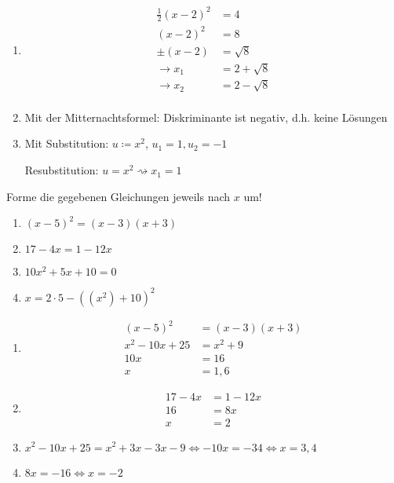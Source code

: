 \begin{lsg}{}
  \begin{multicols}{3}
    \begin{enumerate}
      \item \begin{align*}
        \frac 1 2 (x-2)^2 &= 4\\
        (x-2)^2 &= 8\\
        \pm(x-2)&=\sqrt 8\\
        \rightarrow x_1&=2+\sqrt 8\\
        \rightarrow x_2&=2-\sqrt 8\\
      \end{align*}
      \columnbreak
      \item Mit der Mitternachtsformel: Diskriminante ist negativ, d.h. keine Lösungen
      \columnbreak
      \item Mit Substitution: $u\coloneqq x^2$, $u_1=1, u_2=-1$

			Resubstitution: $u=x^2 \rightsquigarrow x_1=1$
    \end{enumerate}
  \end{multicols}
\end{lsg}


Forme die gegebenen Gleichungen jeweils nach $x$ um!
\begin{multicols}{2}
	\begin{enumerate}
		\item $(x-5)^2=(x-3)(x+3)$
		\item $17-4x=1-12x$
		\item $10x^2+5x+10 = 0$
		\item $x=2\cdot 5-((x^2)+10)^2$
	\end{enumerate}
\end{multicols}

\begin{lsg}{}
	\begin{enumerate}
		\item \begin{align*}
			(x-5)^2 &= (x-3)(x+3)\\
			x^2-10x+25 &= x^2+9\\
			10x &= 16\\
			x &= 1,6
		\end{align*}
		\item \begin{align*}
			17-4x &= 1-12x\\
			16 &= 8x\\
			x &= 2
		\end{align*}
		\item $x^2-10x+25=x^2+3x-3x-9 \Leftrightarrow -10x=-34 \Leftrightarrow x=3,4$
		\item $8x=-16 \Leftrightarrow x=-2$
	\end{enumerate}
\end{lsg}



